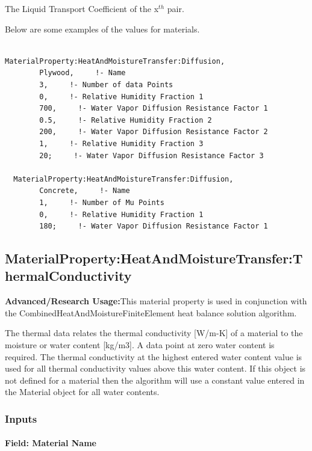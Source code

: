 The Liquid Transport Coefficient of the x\(^{th}\) pair.

Below are some examples of the values for materials.

\begin{lstlisting}

MaterialProperty:HeatAndMoistureTransfer:Diffusion,
        Plywood,     !- Name
        3,     !- Number of data Points
        0,     !- Relative Humidity Fraction 1
        700,     !- Water Vapor Diffusion Resistance Factor 1
        0.5,     !- Relative Humidity Fraction 2
        200,     !- Water Vapor Diffusion Resistance Factor 2
        1,     !- Relative Humidity Fraction 3
        20;     !- Water Vapor Diffusion Resistance Factor 3

  MaterialProperty:HeatAndMoistureTransfer:Diffusion,
        Concrete,     !- Name
        1,     !- Number of Mu Points
        0,     !- Relative Humidity Fraction 1
        180;     !- Water Vapor Diffusion Resistance Factor 1
\end{lstlisting}

\subsection{MaterialProperty:HeatAndMoistureTransfer:ThermalConductivity}\label{materialpropertyheatandmoisturetransferthermalconductivity}

\textbf{Advanced/Research Usage:}This material property is used in conjunction with the CombinedHeatAndMoistureFiniteElement heat balance solution algorithm.

The thermal data relates the thermal conductivity {[}W/m-K{]} of a material to the moisture or water content {[}kg/m3{]}. A data point at zero water content is required. The thermal conductivity at the highest entered water content value is used for all thermal conductivity values above this water content. If this object is not defined for a material then the algorithm will use a constant value entered in the Material object for all water contents.

\subsubsection{Inputs}\label{inputs-12-018}

\paragraph{Field: Material Name}\label{field-material-name-5}

